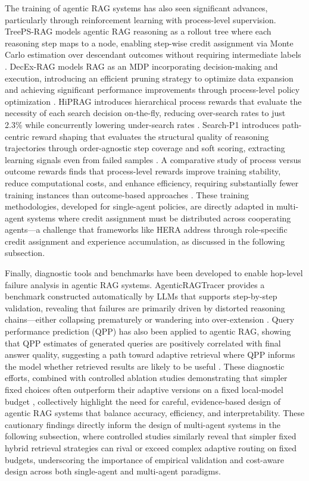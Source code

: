 \documentclass[11pt]{article}
\begin{document}
The training of agentic RAG systems has also seen significant advances, particularly through reinforcement learning with process-level supervision. TreePS-RAG models agentic RAG reasoning as a rollout tree where each reasoning step maps to a node, enabling step-wise credit assignment via Monte Carlo estimation over descendant outcomes without requiring intermediate labels \cite{ref314}. DecEx-RAG models RAG as an MDP incorporating decision-making and execution, introducing an efficient pruning strategy to optimize data expansion and achieving significant performance improvements through process-level policy optimization \cite{ref315}. HiPRAG introduces hierarchical process rewards that evaluate the necessity of each search decision on-the-fly, reducing over-search rates to just 2.3\% while concurrently lowering under-search rates \cite{ref316}. Search-P1 introduces path-centric reward shaping that evaluates the structural quality of reasoning trajectories through order-agnostic step coverage and soft scoring, extracting learning signals even from failed samples \cite{ref266}. A comparative study of process versus outcome rewards finds that process-level rewards improve training stability, reduce computational costs, and enhance efficiency, requiring substantially fewer training instances than outcome-based approaches \cite{ref317}. These training methodologies, developed for single-agent policies, are directly adapted in multi-agent systems where credit assignment must be distributed across cooperating agents---a challenge that frameworks like HERA address through role-specific credit assignment and experience accumulation, as discussed in the following subsection.

Finally, diagnostic tools and benchmarks have been developed to enable hop-level failure analysis in agentic RAG systems. AgenticRAGTracer provides a benchmark constructed automatically by LLMs that supports step-by-step validation, revealing that failures are primarily driven by distorted reasoning chains---either collapsing prematurely or wandering into over-extension \cite{ref318}. Query performance prediction (QPP) has also been applied to agentic RAG, showing that QPP estimates of generated queries are positively correlated with final answer quality, suggesting a path toward adaptive retrieval where QPP informs the model whether retrieved results are likely to be useful \cite{ref319}. These diagnostic efforts, combined with controlled ablation studies demonstrating that simpler fixed choices often outperform their adaptive versions on a fixed local-model budget \cite{ref305}, collectively highlight the need for careful, evidence-based design of agentic RAG systems that balance accuracy, efficiency, and interpretability. These cautionary findings directly inform the design of multi-agent systems in the following subsection, where controlled studies similarly reveal that simpler fixed hybrid retrieval strategies can rival or exceed complex adaptive routing on fixed budgets, underscoring the importance of empirical validation and cost-aware design across both single-agent and multi-agent paradigms.
\end{document}
